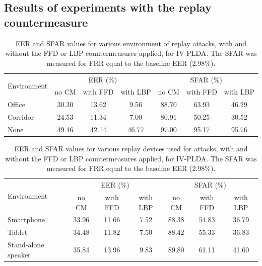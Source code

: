%

\subsection{Results of experiments with the replay countermeasure}


\begin{table}
\begin{center}
    \begin{tabular}{ l || c c c | c c c}
    \hline
 \multirow{2}{*}{Environment}  & \multicolumn{3}{c|}{EER (\%)} & \multicolumn{3}{c}{SFAR (\%)} \\
     	 & no CM & with FFD & with LBP & no CM & with FFD & with LBP\\ 

 \hline \hline
Office   & 30.30 & 13.62 & 9.56 & 88.70 & 63.93 & 46.29\\
Corridor & 24.53 & 11.34 & 7.00 & 80.91 & 50.25 & 30.52\\
None & 49.46 & 42.14 & 46.77 & 97.00 & 95.17 & 95.76\\
\hline
    \end{tabular}
    \caption{EER and SFAR values for various environment of replay attacks, with and without the FFD or LBP countermeasures applied, for IV-PLDA. The SFAR was measured for FRR equal to the baseline EER (2.98\%).}
		\label{tab::results_CM_rooms}
   \end{center}
\end{table}


\begin{table}
\begin{center}
    \begin{tabular}{ l || c c c | c c c}
    \hline
 \multirow{2}{*}{Environment}  & \multicolumn{3}{c|}{EER (\%)} & \multicolumn{3}{c}{SFAR (\%)} \\
     	 & no CM & with FFD & with LBP & no CM & with FFD & with LBP\\ 
 \hline \hline
Smartphone   & 33.96 & 11.66 & 7.52 & 88.38 & 54.83 & 36.79\\
Tablet & 34.48 & 11.82 & 7.50 & 88.42 & 55.33 & 36.83\\
Stand-alone speaker & 35.84 & 13.96 & 9.83 & 89.80 & 61.11 & 41.60\\
\hline
    \end{tabular}
    \caption{EER and SFAR values for various replay devices used for attacks, with and without the FFD or LBP countermeasures applied, for IV-PLDA. The SFAR was measured for FRR equal to the baseline EER (2.98\%).}
		\label{tab::results_CM_spk}
   \end{center}
\end{table}


